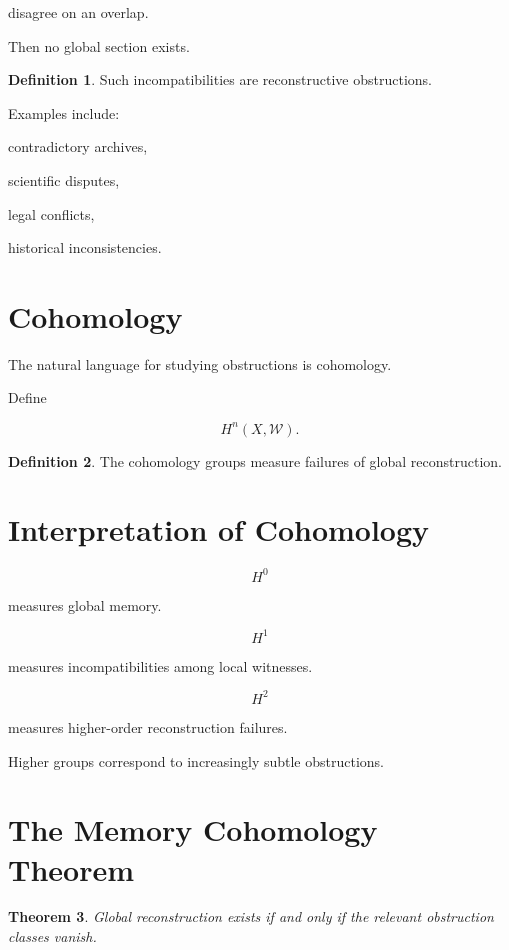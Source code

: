 \documentclass[12pt,oneside]{book}
\theoremstyle{plain} \newtheorem{theorem}{Theorem}[chapter] \newtheorem{lemma}[theorem]{Lemma} \newtheorem{proposition}[theorem]{Proposition} \newtheorem{corollary}[theorem]{Corollary}
\theoremstyle{definition} \newtheorem{definition}[theorem]{Definition} \newtheorem{axiom}[theorem]{Axiom} \newtheorem{construction}[theorem]{Construction}
\theoremstyle{remark} \newtheorem{remark}[theorem]{Remark} \newtheorem{example}[theorem]{Example}
\begin{document}
disagree on an overlap.

Then no global section exists.

\begin{definition}

Such incompatibilities are reconstructive obstructions.

\end{definition}

Examples include:

contradictory archives,

scientific disputes,

legal conflicts,

historical inconsistencies.

\section{Cohomology}

The natural language for studying obstructions is cohomology.

Define

\[
H^n(X,\mathcal W).
\]

\begin{definition}

The cohomology groups measure failures of global reconstruction.

\end{definition}

\section{Interpretation of Cohomology}

\[
H^0
\]

measures global memory.

\[
H^1
\]

measures incompatibilities among local witnesses.

\[
H^2
\]

measures higher-order reconstruction failures.

Higher groups correspond to increasingly subtle obstructions.

\section{The Memory Cohomology Theorem}

\begin{theorem}

Global reconstruction exists if and only if the relevant obstruction classes vanish.

\end{theorem}
\end{document}
